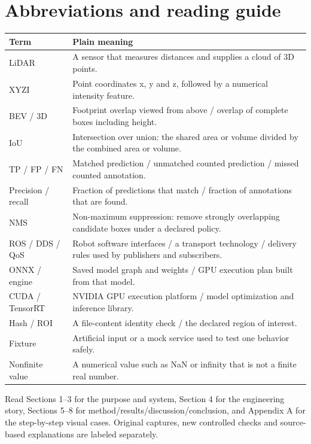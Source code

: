 \documentclass[11pt,a4paper]{article}
\begin{document}
\section*{Abbreviations and reading guide}
\begin{tabularx}{\linewidth}{@{}lY@{}}
\toprule Term & Plain meaning \\ \midrule
LiDAR & A sensor that measures distances and supplies a cloud of 3D points. \\
XYZI & Point coordinates x, y and z, followed by a numerical intensity feature. \\
BEV / 3D & Footprint overlap viewed from above / overlap of complete boxes including height. \\
IoU & Intersection over union: the shared area or volume divided by the combined area or volume. \\
TP / FP / FN & Matched prediction / unmatched counted prediction / missed counted annotation. \\
Precision / recall & Fraction of predictions that match / fraction of annotations that are found. \\
NMS & Non-maximum suppression: remove strongly overlapping candidate boxes under a declared policy. \\
ROS / DDS / QoS & Robot software interfaces / a transport technology / delivery rules used by publishers and subscribers. \\
ONNX / engine & Saved model graph and weights / GPU execution plan built from that model. \\
CUDA / TensorRT & NVIDIA GPU execution platform / model optimization and inference library. \\
Hash / ROI & A file-content identity check / the declared region of interest. \\
Fixture & Artificial input or a mock service used to test one behavior safely. \\
Nonfinite value & A numerical value such as NaN or infinity that is not a finite real number. \\
\bottomrule\end{tabularx}

Read Sections 1–3 for the purpose and system, Section 4 for the engineering story, Sections 5–8 for method/results/discussion/conclusion, and Appendix A for the step-by-step visual cases. Original captures, new controlled checks and source-based explanations are labeled separately.
\clearpage
\end{document}
